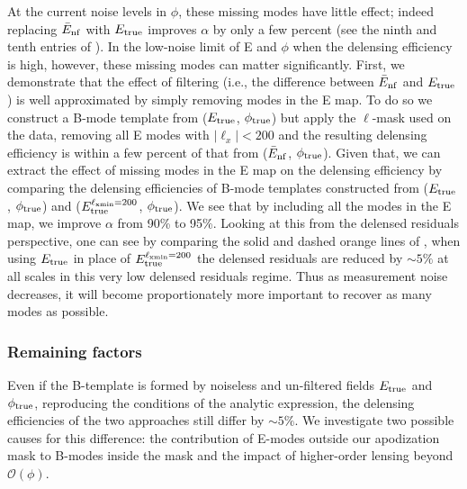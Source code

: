 At the current noise levels in $\phi$, these missing modes have little effect; indeed replacing $\bar{E}_{\rm nf}$ with $E_{\rm true}$ improves $\alpha$ by only a few percent (see the ninth and tenth entries of ).
In the low-noise limit of E and $\phi$ when the delensing efficiency is high, however, these missing modes can matter significantly.
First, we demonstrate that the effect of filtering (i.e., the difference between $\bar{E}_{\rm nf}$ and $E_{\rm true}$) is well approximated by simply removing modes in the E map.
To do so we construct a B-mode template from ($E_{\rm true}$, $\phi_{\rm true}$) but apply the $\ell$-mask used on the data, removing all E modes with $|\ell_x|<200$ and the resulting delensing efficiency is within a few percent of that from ($\bar{E}_{\rm nf}$, $\phi_{\rm true}$).
Given that, we can extract the effect of missing modes in the E map on the delensing efficiency by comparing the delensing efficiencies of B-mode templates constructed from ($E_{\rm true}$, $\phi_{\rm true}$) and ($E_{\rm true}^{\ell_{\rm xmin}=200}$, $\phi_{\rm true}$).
We see that by including all the modes in the E map, we improve $\alpha$ from 90\% to 95\%.
Looking at this from the delensed residuals perspective, one can see by comparing the solid and dashed orange lines of , when using $E_{\rm true}$ in place of $E_{\rm true}^{\ell_{\rm xmin}=200}$ the delensed residuals are reduced by $\sim5\%$ at all scales in this very low delensed residuals regime.
Thus as measurement noise decreases, it will become proportionately more important to recover as many modes as possible.

\subsubsection{Remaining factors}
Even if the B-template is formed by noiseless and un-filtered fields $E_{\rm true}$ and $\phi_{\rm true}$,
reproducing the conditions of the analytic expression, the delensing efficiencies of the two approaches still differ by $\sim 5\%$.
We investigate two possible causes for this difference: the contribution of E-modes outside our apodization mask to B-modes inside the mask and the impact of higher-order lensing beyond $\mathcal{O}(\phi)$.

